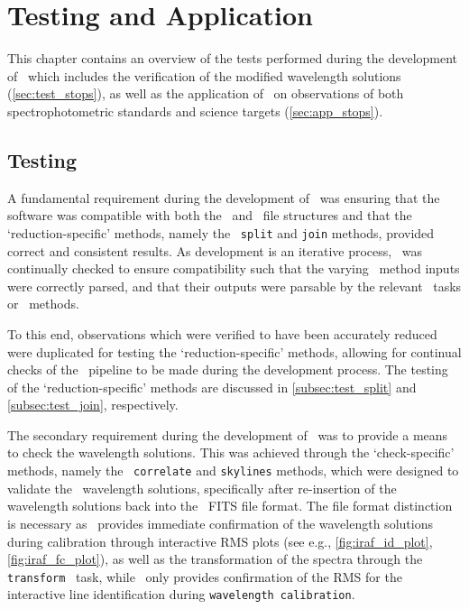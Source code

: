 \chapter{Testing and Application} \label{ch:04}

This chapter contains an overview of the tests performed during the development of \stops\ which includes the verification of the modified wavelength solutions (\autoref{sec:test_stops}), as well as the application of \stops\ on observations of both spectrophotometric standards and science targets (\autoref{sec:app_stops}).

\section[Testing \textsc{stops}]{Testing \stops} \label{sec:test_stops}



A fundamental requirement during the development of \stops\ was ensuring that the software was compatible with both the \polsalt\ and \iraf\ file structures and that the `reduction-specific' methods, namely the \stops\ \texttt{split} and \texttt{join} methods, provided correct and consistent results.
As development is an iterative process, \stops\ was continually checked to ensure compatibility such that the varying \stops\ method inputs were correctly parsed, and that their outputs were parsable by the relevant \iraf\ tasks or \polsalt\ methods.

To this end, observations which were verified to have been accurately reduced were duplicated for testing the `reduction-specific' methods, allowing for continual checks of the \stops\ pipeline to be made during the development process.
The testing of the `reduction-specific' methods are discussed in \autoref{subsec:test_split} and \autoref{subsec:test_join}, respectively.

The secondary requirement during the development of \stops\ was to provide a means to check the wavelength solutions.
This was achieved through the `check-specific' methods, namely the \stops\ \texttt{correlate} and \texttt{skylines} methods, which were designed to validate the \iraf\ wavelength solutions, specifically after re-insertion of the wavelength solutions back into the \polsalt\ \gls{FITS} file format.
The file format distinction is necessary as \iraf\ provides immediate confirmation of the wavelength solutions during calibration through interactive \gls{RMS} plots (see e.g., \autoref{fig:iraf_id_plot}, \ref{fig:iraf_fc_plot}), as well as the transformation of the spectra through the \texttt{transform} \iraf\ task, while \polsalt\ only provides confirmation of the \gls{RMS} for the interactive line identification during \texttt{wavelength calibration}.

